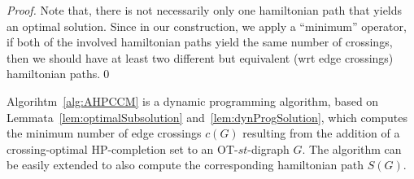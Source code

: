 \documentclass{myllncs-mixalis}
\begin{document}
\begin{proof}
Note that, there is not necessarily only one hamiltonian path that
yields an optimal solution. Since in our construction, we apply a
``minimum'' operator,  if both of the involved hamiltonian paths
yield the same number  of crossings, then we should have at least
two different but equivalent (wrt edge crossings) hamiltonian
paths.\qed
\end{proof}

Algorihtm~\ref{alg:AHPCCM} is a dynamic programming algorithm, based
on Lemmata~\ref{lem:optimalSubsolution}
and~\ref{lem:dynProgSolution}, which computes the minimum number of
edge crossings $c(G)$ resulting from the addition of a
crossing-optimal  HP-completion set  to an OT-$st$-digraph $G$. The
algorithm can be easily extended to also compute the corresponding
hamiltonian path $S(G)$.
\end{document}
